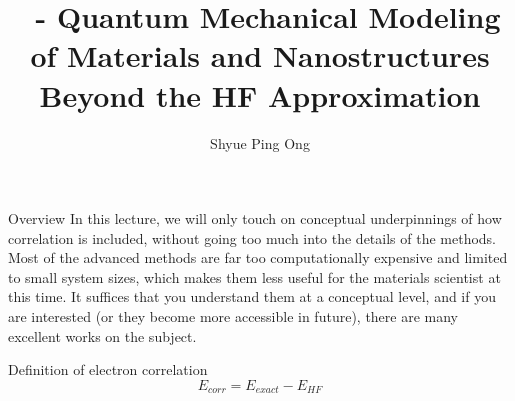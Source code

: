 \documentclass[aspectratio=169]{beamer}
\title[\classname Beyond the HF Approximation]{\classname~- Quantum Mechanical Modeling of Materials and Nanostructures\\Beyond the HF Approximation}
\author{Shyue Ping Ong}
\institute[UCSD]{University of California, San Diego\\
\medskip
}
\date{\classyear} %
\begin{document}
    \begin{frame}
        \titlepage %
    \end{frame}

    \begin{frame}{Overview}
        In this lecture, we will only touch on conceptual underpinnings of how correlation is included, without going too much into the details of the methods. Most of the advanced methods are far too computationally expensive and limited to small system sizes, which makes them less useful for the materials scientist at this time. It suffices that you understand them at a conceptual level, and if you are interested (or they become more accessible in future), there are many excellent works on the subject.


        \begin{alertblock}{Definition of electron correlation}
            \begin{equation*}
                E_{corr} = E_{exact} - E_{HF}
            \end{equation*}
        \end{alertblock}

    \end{frame}
\end{document}
